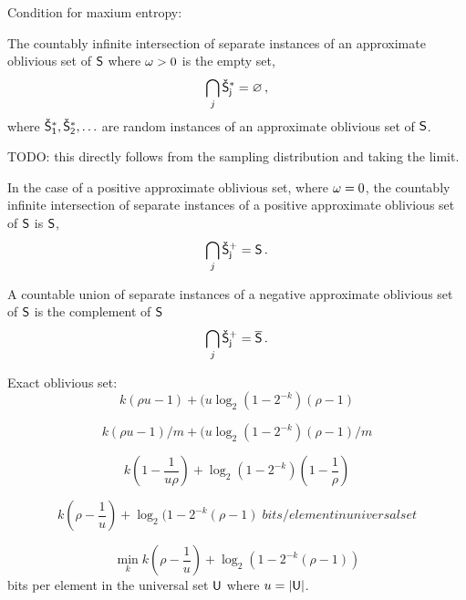 \documentclass[ ../main.tex]{subfiles}
\begin{document}
Condition for maxium entropy:

The countably infinite intersection of separate instances of an approximate oblivious set of $\Set{S}$ where $\omega > 0$ is the empty set,
\begin{equation}
    \bigcap_{j} \OASet{S}[j] = \EmptySet\,,
\end{equation}
where $\OASet{S}[1],\OASet{S}[2],\ldots$ are random instances of an approximate oblivious set of $\Set{S}$.

TODO: this directly follows from the sampling distribution and taking the limit.

In the case of a positive approximate oblivious set, where $\omega = 0$, the countably infinite intersection of separate instances of a positive approximate oblivious set of $\Set{S}$ is $\Set{S}$,
\begin{equation}
    \bigcap_{j} \OPASet{S}[j] = \Set{S}\,.
\end{equation}

A countable union of separate instances of a negative approximate oblivious set of $\Set{S}$ is the complement of $\Set{S}$
\begin{equation}
    \bigcap_{j} \ONASet{S}[j] = \Set{\SetComplement[S]}\,.
\end{equation}



Exact oblivious set:
\begin{equation}
    k (\rho u - 1) + (u \log_2(1 - 2^{-k})(\rho - 1)
\end{equation}

\begin{equation}
    k (\rho u - 1)/m + (u \log_2(1 - 2^{-k})(\rho - 1)/m
\end{equation}

\begin{equation}
    k\left(1 - \frac{1}{u \rho}\right) + \log_2\!\left(1 - 2^{-k}\right)\left(1 - \frac{1}{\rho}\right)
\end{equation}

\begin{equation}
    k (\rho - \frac{1}{u}) + \log_2(1 - 2^{-k}(\rho - 1) \; \si{bits \per element in universal set}
\end{equation}


\begin{theorem}
\begin{equation}
    \min_k k (\rho - \frac{1}{u}) + \log_2\!\left(1 - 2^{-k}(\rho - 1)\right)
\end{equation}
bits per element in the universal set $\Set{U}$ where $u = \Card{\Set{U}}$. 
\end{theorem}
\end{document}
